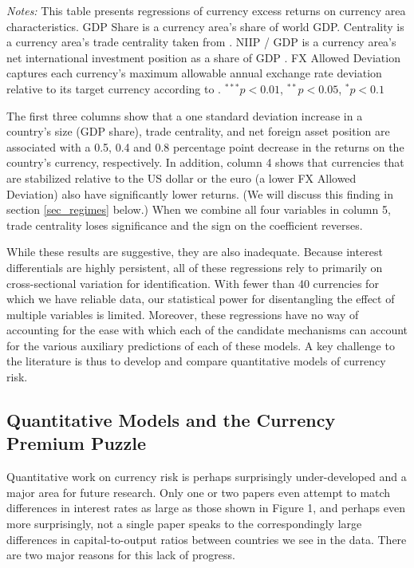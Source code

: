 \documentclass{ar-1col}
\begin{document}
\begin{table}[htp]
\begin{center}
\begin{tabular}{l c c c c c }
\hline
\hline
\end{tabular}
\end{center}
\begin{minipage}[htp!]{\textwidth}
\scriptsize
\emph{Notes:} This table presents regressions of currency excess returns on currency area characteristics. GDP Share is a currency area's share of world GDP. Centrality is a currency area's trade centrality taken from \citet{Richmond2019}. NIIP / GDP is a currency area's net international investment position as a share of GDP \citep{DellaCorteetal2016}. FX Allowed Deviation captures each currency's maximum allowable annual exchange rate deviation relative to its target currency according to \citet{ilzetzki2018exchange}. $^{***}p<0.01$, $^{**}p<0.05$, $^*p<0.1$
\end{minipage}
\end{table}

The first three columns show that a one standard deviation increase in a country's size (GDP share), trade centrality, and net foreign asset position are associated with a 0.5, 0.4 and 0.8 percentage point decrease in the returns on the country's currency, respectively. In addition, column 4 shows that currencies that are stabilized relative to the US dollar or the euro (a lower FX Allowed Deviation) also have significantly lower returns. (We will discuss this finding in section \ref{sec_regimes} below.) When we combine all four variables in column 5, trade centrality loses significance and the sign on the coefficient reverses.

While these results are suggestive, they are also inadequate. Because interest differentials are highly persistent, all of these regressions rely to primarily on cross-sectional variation for identification.  With fewer than 40 currencies for which we have reliable data, our statistical power for disentangling the effect of multiple variables is limited. Moreover, these regressions have no way of accounting for the ease with which each of the candidate mechanisms can account for the various auxiliary predictions of each of these models. A key challenge to the literature is thus to develop and compare quantitative models of currency risk.


\subsection{Quantitative Models and the Currency Premium Puzzle \label{section:cpp}}

Quantitative work on currency risk is perhaps surprisingly under-developed and a major area for future research. Only one or two papers even attempt to match differences in interest rates as large as those shown in Figure 1, and perhaps even more surprisingly, not a single paper speaks to the correspondingly large differences in capital-to-output ratios between countries we see in the data. There are two major reasons for this lack of progress.
\end{document}
